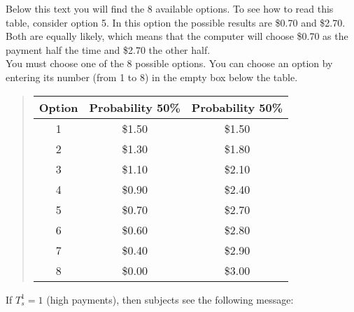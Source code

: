 \documentclass[11pt]{article}
\begin{document}
\begin{tcolorbox}
Below this text you will find the 8 available options. To see how to read this table, consider option 5. In this option the possible results are \$0.70 and \$2.70. Both are equally likely, which means that the computer will choose \$0.70 as the payment half the time and \$2.70 the other half.\\

You must choose one of the 8 possible options. You can choose an option by entering its number (from 1 to 8) in the empty box below the table.

\begin{quote}
\begin{center}
	\begin{tabular}{c|c|c|}
		Option & Probability 50\% & Probability 50\% \\
		\hline 1 & \$1.50 & \$1.50 \\
		\hline 2 & \$1.30 & \$1.80 \\
		\hline 3 & \$1.10 & \$2.10 \\
		\hline 4 & \$0.90 & \$2.40 \\
		\hline 5 & \$0.70 & \$2.70 \\
		\hline 6 & \$0.60 & \$2.80 \\
		\hline 7 & \$0.40 & \$2.90 \\
		\hline 8 & \$0.00 & \$3.00 \\
		\hline
	\end{tabular}
\end{center}
\end{quote}
\end{tcolorbox}

If $T_s^1=1$ (high payments), then subjects see the following message:
\end{document}
